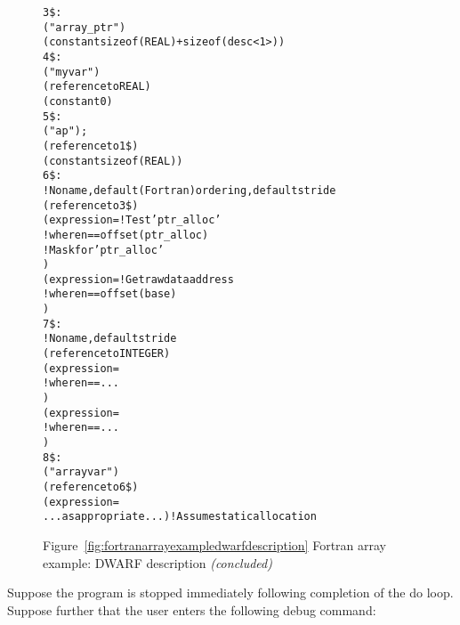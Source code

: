 \begin{figure}
\begin{dwflisting}
\begin{alltt}
3\$: \DWTAGstructuretype
        \DWATname("array\_ptr")
        \DWATbytesize(constant sizeof(REAL) + sizeof(desc<1>))
4\$:     \DWTAGmember
            \DWATname("myvar")
            \DWATtype(reference to REAL)
            \DWATdatamemberlocation(constant 0)
5\$:     \DWTAGmember
            \DWATname("ap");
            \DWATtype(reference to 1\$)
            \DWATdatamemberlocation(constant sizeof(REAL))
6\$: \DWTAGarraytype
        ! No name, default (Fortran) ordering, default stride
        \DWATtype(reference to 3\$)
        \DWATallocated(expression=       ! Test 'ptr\_alloc' 
            \DWOPpushobjectaddress
            \DWOPlitn                  ! where n == offset(ptr\_alloc)
            \DWOPplus
            \DWOPderef
            \DWOPlittwo                    ! Mask for 'ptr\_alloc' 
            \DWOPand)
        \DWATdatalocation(expression=   ! Get raw data address
            \DWOPpushobjectaddress
            \DWOPlitn                  ! where n == offset(base)
            \DWOPplus
            \DWOPderef)
7\$:     \DWTAGsubrangetype
            ! No name, default stride
            \DWATtype(reference to INTEGER)
            \DWATlowerbound(expression=
                \DWOPpushobjectaddress
                \DWOPlitn              ! where n == ...
                \DWOPplus
                \DWOPderef)
            \DWATupperbound(expression=
                \DWOPpushobjectaddress
                \DWOPlitn              ! where n == ...
                \DWOPplus
                \DWOPderef)
8\$: \DWTAGvariable
        \DWATname("arrayvar")
        \DWATtype(reference to 6\$)
        \DWATlocation(expression=
            ...as appropriate...)       ! Assume static allocation
\end{alltt}
\end{dwflisting}
\begin{center}

Figure~\ref{fig:fortranarrayexampledwarfdescription} Fortran array example: DWARF description \textit{(concluded)}
\end{center}
\end{figure}

Suppose 
the program is stopped immediately following completion
of the do loop. Suppose further that the user enters the
following debug command:

